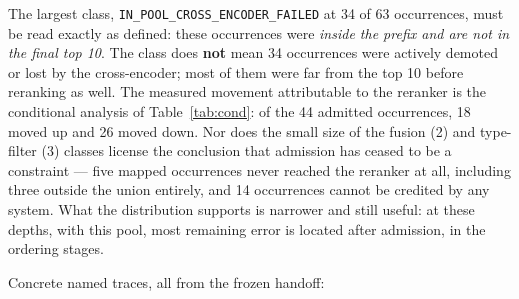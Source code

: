 \documentclass[11pt,a4paper]{article}
\begin{document}
The largest class, \texttt{IN\_POOL\_CROSS\_ENCODER\_FAILED} at 34 of 63 occurrences, must be read exactly as
defined: these occurrences were \emph{inside the prefix and are not in the final top 10}. The class does
\textbf{not} mean 34 occurrences were actively demoted or lost by the cross-encoder; most of them were far
from the top 10 before reranking as well. The measured movement attributable to the reranker is the
conditional analysis of Table~\ref{tab:cond}: of the 44 admitted occurrences, 18 moved up and 26 moved down.
Nor does the small size of the fusion (2) and type-filter (3) classes license the conclusion that admission
has ceased to be a constraint --- five mapped occurrences never reached the reranker at all, including three
outside the union entirely, and 14 occurrences cannot be credited by
any system. What the distribution supports is narrower and still useful: at these depths, with this pool,
most remaining error is located after admission, in the ordering stages.

Concrete named traces, all from the frozen handoff:
\end{document}
